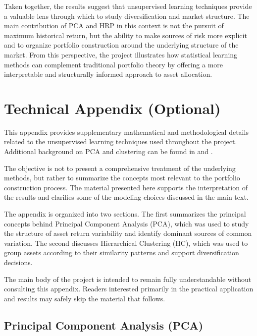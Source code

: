 \documentclass[
  12pt,
  letterpaper,
]{book}
\begin{document}
Taken together, the results suggest that unsupervised learning
techniques provide a valuable lens through which to study
diversification and market structure. The main contribution of PCA and
HRP in this context is not the pursuit of maximum historical return, but
the ability to make sources of risk more explicit and to organize
portfolio construction around the underlying structure of the market.
From this perspective, the project illustrates how statistical learning
methods can complement traditional portfolio theory by offering a more
interpretable and structurally informed approach to asset allocation.

\section{Technical Appendix
(Optional)}\label{technical-appendix-optional-1}

This appendix provides supplementary mathematical and methodological
details related to the unsupervised learning techniques used throughout
the project. Additional background on PCA and clustering can be found in
 and
.

The objective is not to present a comprehensive treatment of the
underlying methods, but rather to summarize the concepts most relevant
to the portfolio construction process. The material presented here
supports the interpretation of the results and clarifies some of the
modeling choices discussed in the main text.

The appendix is organized into two sections. The first summarizes the
principal concepts behind Principal Component Analysis (PCA), which was
used to study the structure of asset return variability and identify
dominant sources of common variation. The second discusses Hierarchical
Clustering (HC), which was used to group assets according to their
similarity patterns and support diversification decisions.

The main body of the project is intended to remain fully understandable
without consulting this appendix. Readers interested primarily in the
practical application and results may safely skip the material that
follows.

\subsection{Principal Component Analysis
(PCA)}\label{principal-component-analysis-pca}
\end{document}
